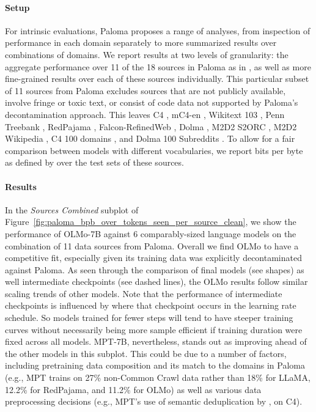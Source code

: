 \documentclass[11pt]{article}
\newcommand{\olmo}{OLMo\xspace}
\newcommand{\model}{OLMo-7B\xspace}
\begin{document}
\paragraph{Setup}
For intrinsic evaluations, Paloma proposes a range of analyses, from inspection of performance in each domain separately to more summarized results over combinations of domains. We report results at two levels of granularity: the aggregate performance over 11 of the 18 sources in Paloma as in \cite{magnusson2023paloma}, as well as more fine-grained results over each of these sources individually. 
This particular subset of 11 sources from Paloma excludes sources that are not publicly available, involve fringe or toxic text, or consist of code data not supported by Paloma's decontamination approach. 
This leaves C4 \citep{raffel2020exploring}, mC4-en \citep{chung2023unimaxfa}, Wikitext 103 \citep{merity2016pointersm}, Penn Treebank \citep{marcusptb,nunesptb}, RedPajama \citep{together2023redpajama}, Falcon-RefinedWeb \citep{penedo2023therd}, Dolma \citep{dolma}, M2D2 S2ORC \citep{reid-etal-2022-m2d2}, M2D2 Wikipedia \citep{reid-etal-2022-m2d2}, C4 100 domains \citep{chronopoulou-etal-2022-efficient}, and Dolma 100 Subreddits \citep{dolma}. To allow for a fair comparison between models with different vocabularies, we report bits per byte as defined by \citet{gao2020pile} over the test sets of these sources.

\paragraph{Results} In the \textit{Sources Combined} subplot of Figure~\ref{fig:paloma_bpb_over_tokens_seen_per_source_clean}, we show the performance of \model against 6 comparably-sized language models on the combination of 11 data sources from Paloma. Overall we find \olmo to have a competitive fit, especially given its training data was explicitly decontaminated against Paloma. As seen through the comparison of final models (see shapes) as well intermediate checkpoints (see dashed lines),  the \olmo results follow similar scaling trends of other models. Note that the performance of intermediate checkpoints is influenced by where that checkpoint occurs in the learning rate schedule. So models trained for fewer steps will tend to have steeper training curves without necessarily being more sample efficient if training duration were fixed across all models. MPT-7B, nevertheless, stands out as improving ahead of the other models in this subplot. This could be due to a number of factors, including pretraining data composition and its match to the domains in Paloma (e.g., MPT trains on 27\%  non-Common Crawl data rather than 18\% for LLaMA, 12.2\% for RedPajama, and 11.2\% for \olmo) as well as various data preprocessing decisions (e.g., MPT's use of semantic deduplication by \citealp{abbas2023semdedup}, on C4).
\end{document}
